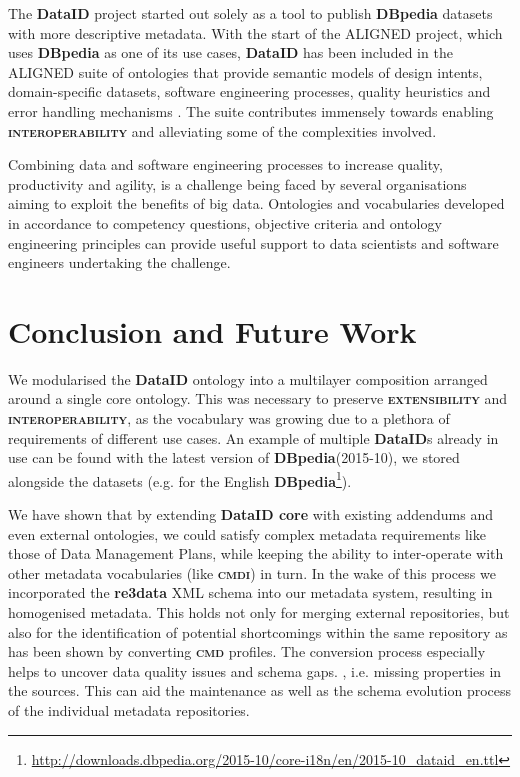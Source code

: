 \documentclass[a4paper,english,twoside,BCOR1.5cm,headsepline,DIV12,appendixprefix,final,12pt]{scrbook}
\newcommand{\extensibility}{{\ttfamily\scshape\bfseries extensibility}\xspace}
\newcommand{\interoperability}{{\ttfamily\scshape\bfseries interoperability}\xspace}
\newcommand{\dataid}{{\ttfamily\bfseries DataID}\xspace}
\newcommand{\core}{{\ttfamily\bfseries DataID core}\xspace}
\newcommand{\cmdi}{{\scshape\bfseries cmdi}\xspace}
\newcommand{\cmd}{{\scshape\bfseries cmd}\xspace}
\newcommand{\dbpedia}{{\ttfamily\bfseries DBpedia}\xspace}
\newcommand{\redata}{{\ttfamily\bfseries re3data}\xspace}
\newcommand\footnoteurl[1]{\footnote{\scriptsize\url{#1}}}
\begin{document}
The \dataid project started out solely as a tool to publish \dbpedia datasets with more descriptive metadata. With the start of the ALIGNED project, which uses \dbpedia as one of its use cases, \dataid has been included in the ALIGNED suite of ontologies that provide semantic models of design intents, domain-specific datasets, software engineering processes, quality heuristics and error handling mechanisms \cite{SolankiBFKDB16}.  The suite contributes immensely towards enabling \interoperability and alleviating some of the complexities involved.

Combining data and software engineering processes to increase quality, productivity and agility, is a challenge being faced by several organisations aiming to exploit the benefits of big data. Ontologies and vocabularies developed in accordance to competency questions, objective criteria and ontology engineering principles can provide useful support to data scientists and software engineers undertaking the challenge. 

\chapter{Conclusion and Future Work}
\label{chap:future}

We modularised the \dataid ontology into a multilayer composition arranged around a single core ontology. This was necessary to preserve \extensibility and \interoperability, as the vocabulary was growing due to a plethora of requirements of different use cases. An example of multiple \dataid{}s already in use can be found with the latest version of \dbpedia (2015-10), we stored alongside the datasets (e.g. for the English \dbpedia\footnoteurl{http://downloads.dbpedia.org/2015-10/core-i18n/en/2015-10_dataid_en.ttl}). 

We have shown that by extending \core with existing addendums and even external ontologies, we could satisfy complex metadata requirements like those of Data Management Plans, while keeping the ability to inter-operate with other metadata vocabularies (like \cmdi) in turn. In the wake of this process we incorporated the \redata XML schema into our metadata system, resulting in homogenised metadata. This holds not only for merging external repositories, but also for the identification of potential shortcomings within the same repository as has been shown by converting \cmd profiles. The conversion process especially helps to uncover data quality issues and schema gaps.
, i.e. missing properties in the sources. 
This can aid the maintenance as well as the schema evolution process of the individual metadata repositories.  
\end{document}
